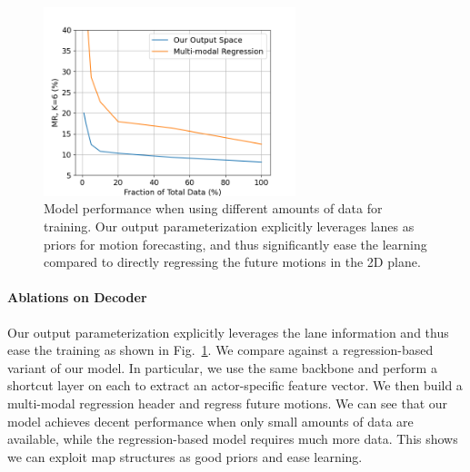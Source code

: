 \begin{figure}[t]
\vspace{-0.2cm}
\vspace{-0.2cm}
\begin{center}
  \includegraphics[height=5.5cm]{figures/supp/data_curve.png}
\end{center}
\vspace{-0.1cm}
\caption{Model performance when using different amounts of data for training.
  Our output parameterization explicitly leverages lanes as priors for motion
  forecasting, and thus significantly ease the learning compared to directly
  regressing the future motions in the 2D plane.
}
\label{fig:output_curve}
\vspace{-0.2cm}
\end{figure}

\paragraph{Ablations on Decoder}
Our output parameterization
explicitly leverages the lane information and thus ease the training as shown in
Fig.~\ref{fig:output_curve}. We compare against a
regression-based variant of our model. In particular, we use the same backbone
and perform a shortcut layer on each \ROI to extract an
actor-specific feature vector. We then build a multi-modal regression header
and regress future motions.
We can see that our
model achieves decent performance when only small amounts of
data are available, while
the regression-based model requires much more
data. This shows we can exploit map structures as good priors and ease
learning.














